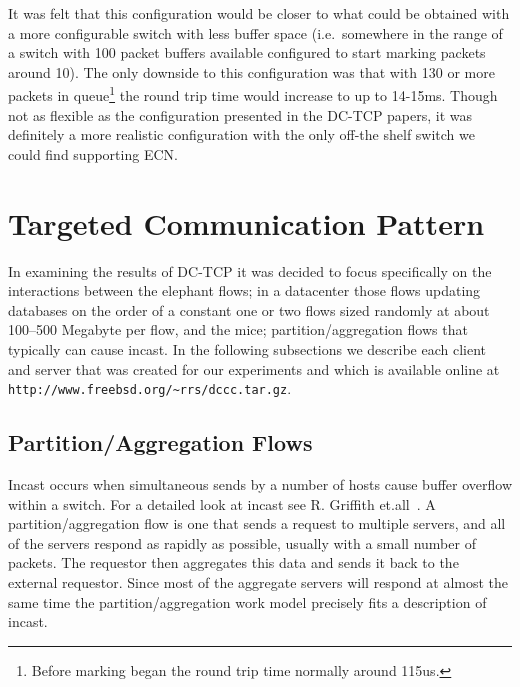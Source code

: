 \documentclass[12pt]{article}
\begin{document}
 It was felt that this configuration would be closer to what could be obtained with a more
 configurable switch with less buffer space (i.e.~somewhere in the range of a switch with
 100 packet buffers available configured to start marking packets around 10).  The only downside
 to this configuration was that with 130 or more packets in queue\footnote{Before marking began the
 round trip time normally around 115us.} the round trip time would increase to up to 14-15ms.
 Though not as flexible as the configuration presented in the DC-TCP papers, it was definitely a more realistic configuration with the only
 off-the shelf  switch we could find supporting ECN.
 
\section{Targeted Communication Pattern}
In examining the results of DC-TCP it was decided to focus specifically on the interactions between
the elephant flows; in a datacenter those flows updating databases on the order of a constant one or two flows
sized randomly at about 100--500 Megabyte per flow, and the mice; partition/aggregation flows that typically 
can cause incast. In the following subsections we describe each client and server that was created for
our experiments and which is available online at \texttt{http://www.freebsd.org/\textasciitilde rrs/dccc.tar.gz}.

\subsection{Partition/Aggregation Flows}
\label{partition}

Incast occurs when simultaneous sends by a number of hosts cause buffer overflow within
a switch. For a detailed look at incast see R. Griffith et.all~\cite{griffen}. A
partition/aggregation flow is one that sends a request to multiple servers, and all of the servers respond
as rapidly as possible, usually with a small number of packets. The requestor then aggregates
this data and sends it back to the external requestor. Since most of the aggregate servers will respond
at almost the same time the partition/aggregation work model precisely fits a description of incast. 
\end{document}
